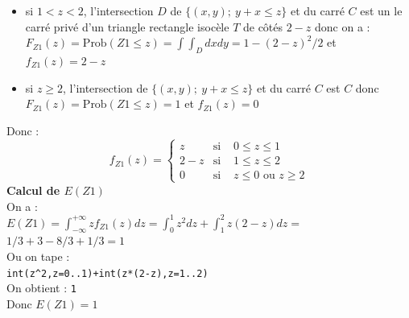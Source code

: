\documentclass[a4paper,11pt]{book}
\begin{document}
\begin{enumerate}
\begin{enumerate}
\begin{itemize}
\item si $1<z<2$, l'intersection $D$ de $\{(x,y);\   y+x\leq z\}$ et du carr\'e 
$C$ est un le carr\'e priv\'e d'un triangle rectangle isoc\`ele $T$ de 
c\^ot\'es $2-z$ donc on a :\\
$F_{Z1}(z)=\mbox{Prob}(Z1\leq z)=\int\int_Ddxdy=1-(2-z)^2/2$ et $f_{Z1}(z)=2-z$
\item si $z\geq 2$, l'intersection de $\{(x,y) ;\   y+x\leq z\}$ et du carr\'e $C$ est $C$ donc
 $F_{Z1}(z)=\mbox{Prob}(Z1\leq z)=1$ et $f_{Z1}(z)=0$
\end{itemize}
Donc :
$$
f_{Z1}(z)=
\left\{
\begin{array}{rll}
z & \mbox{si }&0\leq z \leq 1\\
2-z & \mbox{si }&1\leq z \leq 2\\
0 & \mbox{si }& z\leq 0 \mbox{ ou } z \geq 2
\end{array}
\right.
$$
{\bf Calcul de $E(Z1)$}\\
On a :\\
$\displaystyle E(Z1)=\int_{-\infty}^{+\infty}zf_{Z1}(z)dz=\int_0^1z^2dz+\int_1^2z(2-z)dz=$\\
$1/3+3-8/3+1/3=1$\\
Ou on tape :\\
{\tt int(z\verb|^|2,z=0..1)+int(z*(2-z),z=1..2)}\\
On obtient : {\tt 1}\\
Donc $E(Z1)=1$


\end{enumerate}
\end{enumerate}
\end{document}
